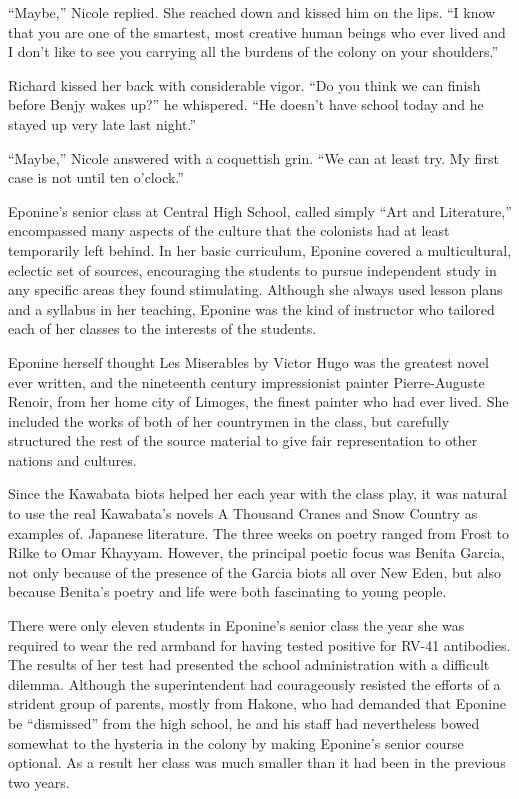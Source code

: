 \documentclass[]{article}
\begin{document}
{“Maybe,” Nicole replied. She reached down and kissed him on the lips. “I know that you are one of the smartest, most creative human beings who ever lived and I don’t like to see you carrying all the burdens of the colony on your shoulders.”

Richard kissed her back with considerable vigor. “Do you think we can finish before Benjy wakes up?” he whispered. “He doesn’t have school today and he stayed up very late last night.”

“Maybe,” Nicole answered with a coquettish grin. “We can at least try. My first case is not until ten o’clock.”

Eponine’s senior class at Central High School, called simply “Art and Literature,” encompassed many aspects of the culture that the colonists had at least temporarily left behind. In her basic curriculum, Eponine covered a multicultural, eclectic set of sources, encouraging the students to pursue independent study in any specific areas they found stimulating. Although she always used lesson plans and a syllabus in her teaching, Eponine was the kind of instructor who tailored each of her classes to the interests of the students.

Eponine herself thought Les Miserables by Victor Hugo was the greatest novel ever written, and the nineteenth century impressionist painter Pierre-Auguste Renoir, from her home city of Limoges, the finest painter who had ever lived. She included the works of both of her countrymen in the class, but carefully structured the rest of the source material to give fair representation to other nations and cultures.

Since the Kawabata biots helped her each year with the class play, it was natural to use the real Kawabata’s novels A Thousand Cranes and Snow Country as examples of. Japanese literature. The three weeks on poetry ranged from Frost to Rilke to Omar Khayyam. However, the principal poetic focus was Benita Garcia, not only because of the presence of the Garcia biots all over New Eden, but also because Benita’s poetry and life were both fascinating to young people.

There were only eleven students in Eponine’s senior class the year she was required to wear the red armband for having tested positive for RV-41 antibodies. The results of her test had presented the school administration with a difficult dilemma. Although the superintendent had courageously resisted the efforts of a strident group of parents, mostly from Hakone, who had demanded that Eponine be “dismissed” from the high school, he and his staff had nevertheless bowed somewhat to the hysteria in the colony by making Eponine’s senior course optional. As a result her class was much smaller than it had been in the previous two years.

}
\end{document}
